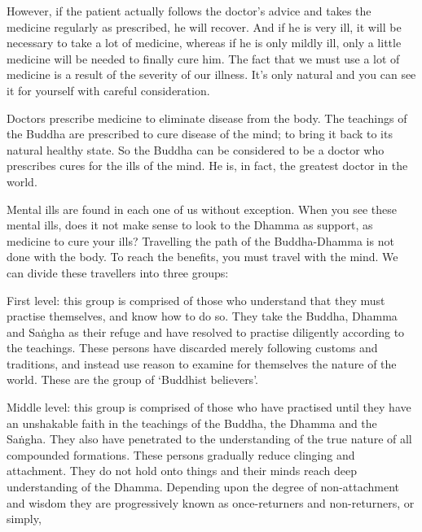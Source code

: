 However, if the patient actually follows the doctor's advice and takes the medicine regularly as prescribed, he will recover. And if he is very ill, it will be necessary to take a lot of medicine, whereas if he is only mildly ill, only a little medicine will be needed to finally cure him. The fact that we must use a lot of medicine is a result of the severity of our illness. It's only natural and you can see it for yourself with careful consideration.


Doctors prescribe medicine to eliminate disease from the body. The teachings of the Buddha are prescribed to cure disease of the mind; to bring it back to its natural healthy state. So the Buddha can be considered to be a doctor who prescribes cures for the ills of the mind. He is, in fact, the greatest doctor in the world.

Mental ills are found in each one of us without exception. When you see these mental ills, does it not make sense to look to the Dhamma as support, as medicine to cure your ills? Travelling the path of the Buddha-Dhamma is not done with the body. To reach the benefits, you must travel with the mind. We can divide these travellers into three groups:

First level: this group is comprised of those who understand that they must practise themselves, and know how to do so. They take the Buddha, Dhamma and Sa\.ngha as their refuge and have resolved to practise diligently according to the teachings. These persons have discarded merely following customs and traditions, and instead use reason to examine for themselves the nature of the world. These are the group of `Buddhist believers'.

Middle level: this group is comprised of those who have practised until they have an unshakable faith in the teachings of the Buddha, the Dhamma and the Sa\.ngha. They also have penetrated to the understanding of the true nature of all compounded formations. These persons gradually reduce clinging and attachment. They do not hold onto things and their minds reach deep understanding of the Dhamma. Depending upon the degree of non-attachment and wisdom they are progressively known as  once-returners and non-returners, or simply, 

